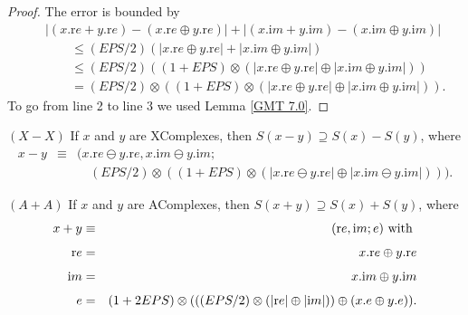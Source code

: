 \begin{proof}{}
The error is bounded by
\begin{eqnarray*}
&&|(x.{\mathrm re} + y.{\mathrm re}) - (x.{\mathrm re} \oplus y.{\mathrm re})| + 
  |(x.{\mathrm im} + y.{\mathrm im}) - (x.{\mathrm im} \oplus y.{\mathrm im})|\\[4pt]
&&\qquad \le (EPS/2)(| x.{\mathrm re} \oplus y.{\mathrm re}| + 
   |x.{\mathrm im} \oplus y.{\mathrm im}|)\\[4pt]
&&\qquad \le (EPS/2)((1 + EPS) \otimes (| x.{\mathrm re} \oplus y.{\mathrm re}| \oplus 
   |x.{\mathrm im} \oplus y.{\mathrm im}|))\\[4pt]
&&\qquad = (EPS/2) \otimes ((1 + EPS) \otimes (| x.{\mathrm re} \oplus y.{\mathrm re}| \oplus 
   |x.{\mathrm im} \oplus y.{\mathrm im}|)).
\end{eqnarray*}
To go from line 2 to line 3 we used Lemma \ref{GMT 7.0}. \end{proof}

\begin{proposition}\label{GMT prop7.5}{$(X - X)$}
If $x$ and $y$ are {\textrm XComplexes,} then 
$S(x - y) \supseteq S(x) - S(y)${\textrm ,} where
\begin{eqnarray*}
x - y &\equiv& (x.{\mathrm re} \ominus y.{\mathrm re}, x.{\mathrm im} \ominus y.{\mathrm im};\\[4pt]
&&\quad 
(EPS/2)\otimes ((1 + EPS) \otimes (|x.{\mathrm re} \ominus y.{\mathrm re}| \oplus |x.{\mathrm im} \ominus y.{\mathrm im}|))).
\end{eqnarray*} \end{proposition}


\begin{proposition}\label{GMT prop7.6}{$(A + A)$} 
If $x$ and $y$ are {\textrm AComplexes,} then 
$S(x + y) \supseteq S(x) + S(y)${\textrm ,} where
\begin{eqnarray*}
 x+y &\equiv& ({\mathrm re},{\mathrm im};e) \hbox{ with }\\[4pt]
{\mathrm re}& =& x.{\mathrm re} \oplus y.{\mathrm re}\\[4pt]
{\mathrm im}& =& x.{\mathrm im} \oplus y.{\mathrm im}\\[4pt]
e& =& (1 + 2 EPS) \otimes ( ((EPS/2) \otimes (|{\mathrm re}| \oplus |{\mathrm im}|))
 \oplus (x.e \oplus y.e)). \end{eqnarray*}
\end{proposition}

